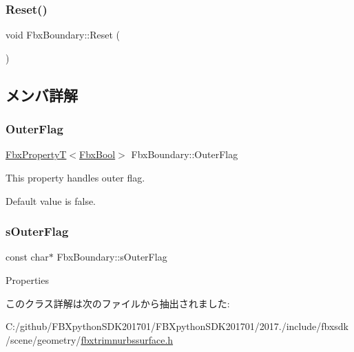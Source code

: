 \mbox{\label{class_fbx_boundary_a989aba9b8873dc0c8264879b75f86dee}} 
\subsubsection{\texorpdfstring{Reset()}{Reset()}}
{\footnotesize\ttfamily void Fbx\+Boundary\+::\+Reset (\begin{DoxyParamCaption}{ }\end{DoxyParamCaption})\hspace{0.3cm}{\ttfamily [protected]}}



\subsection{メンバ詳解}
\mbox{\label{class_fbx_boundary_af9e27e491f466ca615bd247fa2b33826}} 
\subsubsection{\texorpdfstring{Outer\+Flag}{OuterFlag}}
{\footnotesize\ttfamily \hyperlink{class_fbx_property_t}{Fbx\+PropertyT}$<$\hyperlink{fbxtypes_8h_a92e0562b2fe33e76a242f498b362262e}{Fbx\+Bool}$>$ Fbx\+Boundary\+::\+Outer\+Flag}

This property handles outer flag.

Default value is false. \mbox{\label{class_fbx_boundary_a2a42aaddc584761f409ced017e6ddd35}} 
\subsubsection{\texorpdfstring{s\+Outer\+Flag}{sOuterFlag}}
{\footnotesize\ttfamily const char$\ast$ Fbx\+Boundary\+::s\+Outer\+Flag\hspace{0.3cm}{\ttfamily [static]}}



Properties 



このクラス詳解は次のファイルから抽出されました\+:\begin{DoxyCompactItemize}
\item 
C\+:/github/\+F\+B\+Xpython\+S\+D\+K201701/\+F\+B\+Xpython\+S\+D\+K201701/2017./include/fbxsdk/scene/geometry/\hyperlink{fbxtrimnurbssurface_8h}{fbxtrimnurbssurface.\+h}\end{DoxyCompactItemize}
